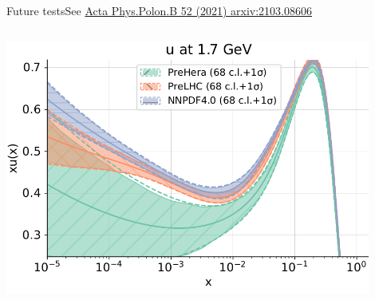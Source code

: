 \documentclass[aspectratio=169,9pt]{beamer}
\begin{document}
\begin{frame}[t]{Future tests}{See \href{https://arxiv.org/pdf/2111.05787.pdf}{\color{blue}Acta Phys.Polon.B 52 (2021) arxiv:2103.08606}}
\begin{columns}
        \includegraphics[width=0.9\textwidth]{diffu}
    \end{columns}
\end{frame}
\end{document}
